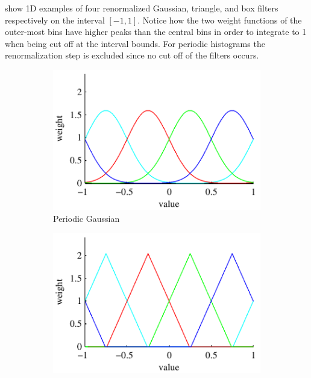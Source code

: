 \documentclass[thesis.tex]{subfiles}
\begin{document}
 show 1D examples of four renormalized Gaussian, triangle, and box filters respectively on the interval $[-1,1]$. Notice how the two weight functions of the outer-most bins have higher peaks than the central bins in order to integrate to 1 when being cut off at the interval bounds. For periodic histograms the renormalization step is excluded since no cut off of the filters occurs.

\begin{figure}
	\centering
	\begin{subfigure}[t]{0.32\textwidth}
		\includegraphics[width=\textwidth]{img/binFilterGaussianPeriodic.pdf}
		\caption{Periodic Gaussian}
		\label{fig:1dFilterGaussianPeriodic}
	\end{subfigure}
	\begin{subfigure}[t]{0.32\textwidth}
		\includegraphics[width=\textwidth]{img/binFilterTrianglePeriodic.pdf}

\end{subfigure}
\end{figure}
\end{document}
